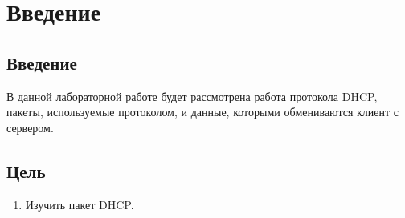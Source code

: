 \chapter{Введение}
\label{ch:intro}

\section{Введение}
В данной лабораторной работе будет рассмотрена работа протокола DHCP, пакеты,
используемые протоколом, и данные, которыми обмениваются клиент с сервером.

\section{Цель}  

\begin{enumerate}
    \item Изучить пакет DHCP.
\end{enumerate}

  
\endinput 